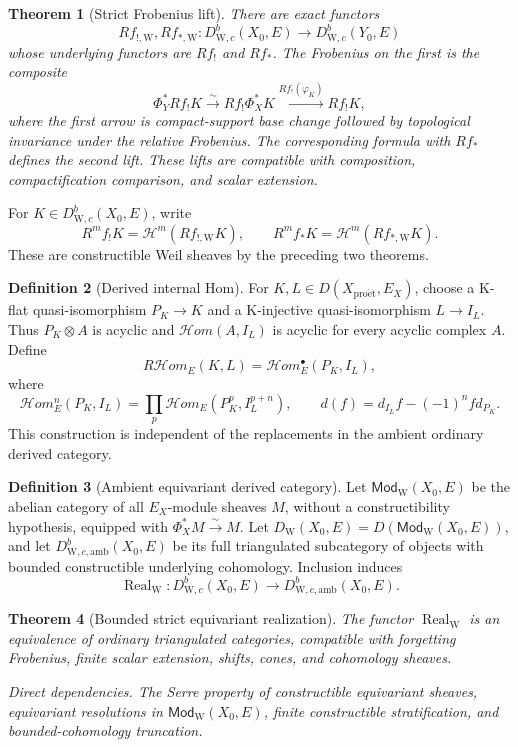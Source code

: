 \documentclass[10pt]{article}
\newtheorem{theorem}{Theorem}[section]
\theoremstyle{definition}
\newtheorem{definition}[theorem]{Definition}
\newcommand{\DW}{D^b_{\mathrm W,c}}
\newcommand{\dep}[1]{\par\smallskip\noindent\textit{Direct dependencies.} #1\par}
\begin{document}
\begin{theorem}[Strict Frobenius lift]
There are exact functors
\[
 Rf_{!,\mathrm W},Rf_{*,\mathrm W}:\DW(X_0,E)
                       \longrightarrow\DW(Y_0,E)
\]
whose underlying functors are \(Rf_!\) and \(Rf_*\).  The Frobenius on the
first is the composite
\[
 \Phi_Y^*Rf_!K\xrightarrow{\sim}Rf_!\Phi_X^*K
             \xrightarrow{Rf_!(\varphi_K)}Rf_!K,
\]
where the first arrow is compact-support base change followed by topological
invariance under the relative Frobenius.  The corresponding formula with
\(Rf_*\) defines the second lift.  These lifts are compatible with
composition, compactification comparison, and scalar extension.
\end{theorem}

For \(K\in\DW(X_0,E)\), write
\[
              R^mf_!K=\mathcal H^m(Rf_{!,\mathrm W}K),\qquad
              R^mf_*K=\mathcal H^m(Rf_{*,\mathrm W}K).
\]
These are constructible Weil sheaves by the preceding two theorems.

\begin{definition}[Derived internal Hom]
For \(K,L\in D(X_{\mathrm{pro\acute et}},E_X)\), choose a K-flat
quasi-isomorphism \(P_K\to K\) and a K-injective quasi-isomorphism
\(L\to I_L\).  Thus \(P_K\otimes A\) is acyclic and
\(\mathcal Hom(A,I_L)\) is acyclic for every acyclic complex \(A\).
Define
\[
 R\mathcal Hom_E(K,L)=\mathcal Hom_E^\bullet(P_K,I_L),
\]
where
\[
 \mathcal Hom_E^n(P_K,I_L)=\prod_p
       \mathcal Hom_E(P_K^p,I_L^{p+n}),
 \qquad d(f)=d_{I_L}f-(-1)^nf d_{P_K}.
\]
This construction is independent of the replacements in the ambient
ordinary derived category.
\end{definition}

\begin{definition}[Ambient equivariant derived category]
Let \(\mathsf{Mod}_{\mathrm W}(X_0,E)\) be the abelian category of all
\(E_X\)-module sheaves \(M\), without a constructibility hypothesis,
equipped with \(\Phi_X^*M\xrightarrow{\sim}M\).  Let
\(D_{\mathrm W}(X_0,E)=D(\mathsf{Mod}_{\mathrm W}(X_0,E))\), and let
\(D^b_{\mathrm W,c,\mathrm{amb}}(X_0,E)\) be its full triangulated
subcategory of objects with bounded constructible underlying cohomology.
Inclusion induces
\[
 \operatorname{Real}_{\mathrm W}:\DW(X_0,E)
             \longrightarrow D^b_{\mathrm W,c,\mathrm{amb}}(X_0,E).
\]
\end{definition}

\begin{theorem}[Bounded strict equivariant realization]
The functor \(\operatorname{Real}_{\mathrm W}\) is an equivalence of
ordinary triangulated categories, compatible with forgetting Frobenius,
finite scalar extension, shifts, cones, and cohomology sheaves.
\dep{The Serre property of constructible equivariant sheaves, equivariant
resolutions in \(\mathsf{Mod}_{\mathrm W}(X_0,E)\), finite constructible
stratification, and bounded-cohomology truncation.}
\end{theorem}
\end{document}
